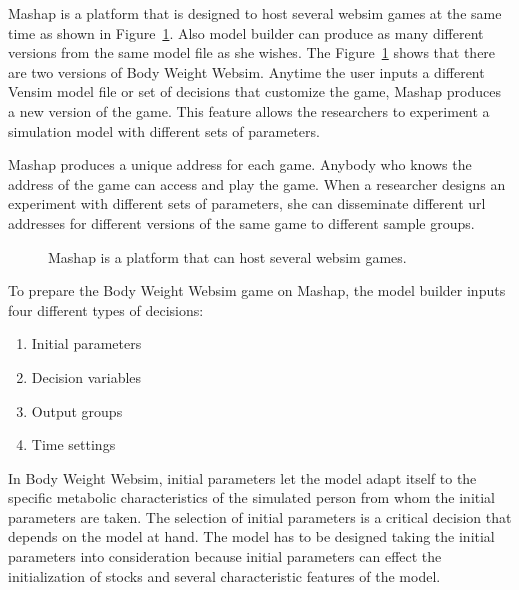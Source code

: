 \documentclass[12pt,a4paper]{paper}
\begin{document}
Mashap is a platform that is designed to host several websim games at the same time as shown in Figure~\ref{fig:mashap_platform_hosts_many_games}. Also model builder can produce as many different versions from the same model file as she wishes. The Figure~\ref{fig:mashap_platform_hosts_many_games} shows that there are two versions of Body Weight Websim. Anytime the user inputs a different Vensim model file or set of decisions that customize the game, Mashap produces a new version of the game. This feature allows the researchers to experiment a simulation model with different sets of parameters.

Mashap produces a unique address for each game. Anybody who knows the address of the game can access and play the game. When a researcher designs an experiment with different sets of parameters, she can disseminate different url addresses for different versions of the same game to different sample groups. \\ 

\begin{figure}
	\centering
\caption{Mashap is a platform that can host several websim games.}%
\label{fig:mashap_platform_hosts_many_games}%
\end{figure}

To prepare the Body Weight Websim game on Mashap, the model builder inputs four different types of decisions:

\begin{enumerate}
	\item Initial parameters 
	\item Decision variables 
	\item Output groups 
	\item Time settings 
\end{enumerate}

In Body Weight Websim, initial parameters let the model adapt itself to the specific metabolic characteristics of the simulated person from whom the initial parameters are taken. The selection of initial parameters is a critical decision that depends on the model at hand. The model has to be designed taking the initial parameters into consideration because initial parameters can effect the initialization of stocks and several characteristic features of the model. 
\end{document}
